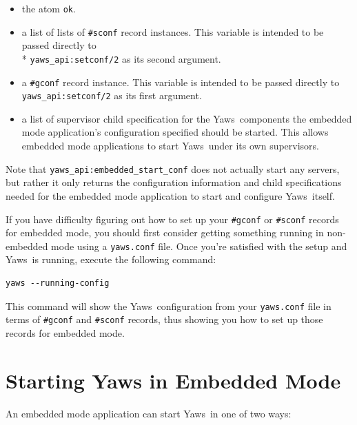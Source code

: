 \documentclass[11pt,oneside,english]{book}
\newcommand{\Yaws}            %
        {{\sc Yaws}}
\begin{document}
\begin{itemize}

\item the atom \verb+ok+.

\item a list of lists of \verb+#sconf+ record instances. This variable
  is intended to be passed directly to\\* \verb+yaws_api:setconf/2+ as
  its second argument.

\item a \verb+#gconf+ record instance. This variable is intended to
  be passed directly to \verb+yaws_api:setconf/2+ as its first
  argument.

\item a list of supervisor child specification for the
  \Yaws\  components the embedded mode application's configuration
  specified should be started. This allows embedded mode applications
  to start \Yaws\  under its own supervisors.

\end{itemize}

Note that \verb+yaws_api:embedded_start_conf+ does not actually start
any servers, but rather it only returns the configuration information
and child specifications needed for the embedded mode application to
start and configure \Yaws\  itself.

If you have difficulty figuring out how to set up your \verb+#gconf+
or \verb+#sconf+ records for embedded mode, you should first consider
getting something running in non-embedded mode using a
\verb+yaws.conf+ file. Once you're satisfied with the setup and
\Yaws\  is running, execute the following command:

\begin{verbatim}
yaws --running-config
\end{verbatim}

This command will show the \Yaws\ configuration from your
\verb+yaws.conf+ file in terms of \verb+#gconf+ and \verb+#sconf+
records, thus showing you how to set up those records for embedded
mode.

\section{Starting Yaws in Embedded Mode}

An embedded mode application can start \Yaws\  in one of two ways:
\end{document}
